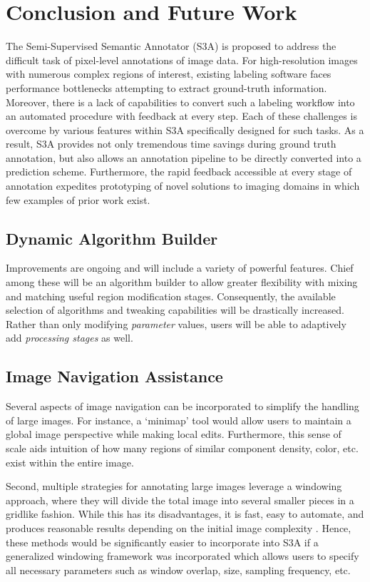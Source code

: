 \section{Conclusion and Future Work}
The Semi-Supervised Semantic Annotator (S3A) is proposed to address the difficult task of pixel-level annotations of image data. For high-resolution images with numerous complex regions of interest, existing labeling software faces performance bottlenecks attempting to extract ground-truth information. Moreover, there is a lack of capabilities to convert such a labeling workflow into an automated procedure with feedback at every step. Each of these challenges is overcome by various features within S3A specifically designed for such tasks. As a result, S3A provides not only tremendous time savings during ground truth annotation, but also allows an annotation pipeline to be directly converted into a prediction scheme. Furthermore, the rapid feedback accessible at every stage of annotation expedites prototyping of novel solutions to imaging domains in which few examples of prior work exist.

\subsection{Dynamic Algorithm Builder}
Improvements are ongoing and will include a variety of powerful features. Chief among these will be an algorithm builder to allow greater flexibility with mixing and matching useful region modification stages. Consequently, the available selection of algorithms and tweaking capabilities will be drastically increased. Rather than only modifying \emph{parameter} values, users will be able to adaptively add \emph{processing stages} as well.

\subsection{Image Navigation Assistance}
Several aspects of image navigation can be incorporated to simplify  the handling of large images. For instance, a `minimap' tool would allow users to maintain a global image perspective while making local edits. Furthermore, this sense of scale aids intuition of how many regions of similar component density, color, etc. exist within the entire image.

Second, multiple strategies for annotating large images leverage a windowing approach, where they will divide the total image into several smaller pieces in a gridlike fashion. While this has its disadvantages, it is fast, easy to automate, and produces reasonable results depending on the initial image complexity \cite{Vigueras_fullCnnCornealSegmentation}. Hence, these methods would be significantly easier to incorporate into S3A if a generalized windowing framework was incorporated which allows users to specify all necessary parameters such as window overlap, size, sampling frequency, etc.


